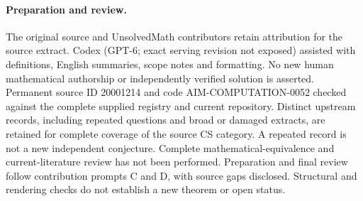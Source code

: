 \documentclass[11pt]{article}
\begin{document}
\paragraph{Preparation and review.}
The original source and UnsolvedMath contributors retain attribution for the source extract. Codex (GPT-6; exact serving revision not exposed) assisted with definitions, English summaries, scope notes and formatting. No new human mathematical authorship or independently verified solution is asserted. Permanent source ID 20001214 and code AIM-COMPUTATION-0052 checked against the complete supplied registry and current repository. Distinct upstream records, including repeated questions and broad or damaged extracts, are retained for complete coverage of the source CS category. A repeated record is not a new independent conjecture. Complete mathematical-equivalence and current-literature review has not been performed. Preparation and final review follow contribution prompts C and D, with source gaps disclosed. Structural and rendering checks do not establish a new theorem or open status.
\label{end:20001214}
\end{document}
